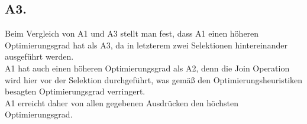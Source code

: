 \documentclass[11pt,german]{article}
\begin{document}
\subsection*{A3.}
\begin{center}
\end{center}
Beim Vergleich von A1 und A3 stellt man fest, dass A1 einen höheren Optimierungsgrad hat als A3, da in letzterem zwei Selektionen hintereinander ausgeführt werden.\\
A1 hat auch einen höheren Optimierungsgrad als A2, denn die Join Operation wird hier vor der Selektion durchgeführt, was gemäß den Optimierungsheuristiken besagten Optimierungsgrad verringert.\\
A1 erreicht daher von allen gegebenen Ausdrücken den höchsten Optimierungsgrad. 
\end{document}
